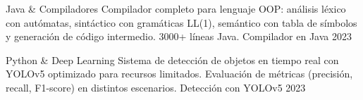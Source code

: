 \begin{cvhonors}

  \cvhonor
    {Java \& Compiladores}
    {Compilador completo para lenguaje OOP: análisis léxico con autómatas, sintáctico con gramáticas LL(1), semántico con tabla de símbolos y generación de código intermedio. 3000+ líneas Java.}
    {Compilador en Java}
    {2023}

  \cvhonor
    {Python \& Deep Learning}
    {Sistema de detección de objetos en tiempo real con YOLOv5 optimizado para recursos limitados. Evaluación de métricas (precisión, recall, F1-score) en distintos escenarios.}
    {Detección con YOLOv5}
    {2023}

\end{cvhonors}
